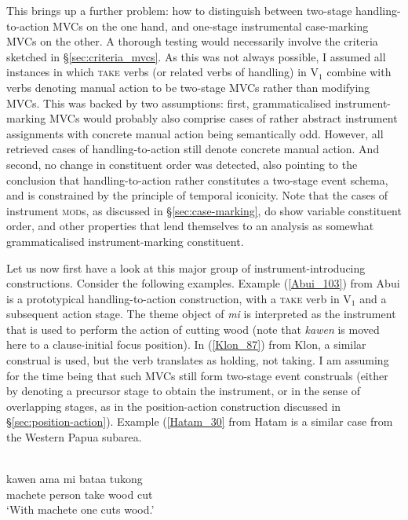 This brings up a further problem: how to distinguish between two-stage handling-to-action MVCs on the one hand, and one-stage instrumental case-marking MVCs on the other. A thorough testing would necessarily involve the criteria sketched in §\ref{sec:criteria_mvcs}. As this was not always possible, I assumed all instances in which \textsc{take} verbs (or related verbs of handling) in V$_1$ combine with verbs denoting manual action to be two-stage MVCs rather than modifying MVCs. This was backed by two assumptions: first, grammaticalised instrument-marking MVCs would probably also comprise cases of rather abstract instrument assignments with concrete manual action being semantically odd. However, all retrieved cases of handling-to-action still denote concrete manual action. And second, no change in constituent order was detected, also pointing to the conclusion that handling-to-action rather constitutes a two-stage event schema, and is constrained by the principle of temporal iconicity. Note that the cases of instrument \textsc{mod}s, as discussed in §\ref{sec:case-marking}, do show variable constituent order, and other properties that lend themselves to an analysis as somewhat grammaticalised instrument-marking constituent.

Let us now first have a look at this major group of instrument-introducing constructions. Consider the following examples. Example (\ref{Abui_103}) from Abui is a prototypical handling-to-action construction, with a \textsc{take} verb in V$_1$ and a subsequent action stage. The theme object of \textit{mi} is interpreted as the instrument that is used to perform the action of cutting wood (note that \textit{kawen} is moved here to a clause-initial focus position). In (\ref{Klon_87}) from Klon, a similar construal is used, but the verb translates as holding, not taking. I am assuming for the time being that such MVCs still form two-stage event construals (either by denoting a precursor stage to obtain the instrument, or in the sense of overlapping stages, as in the position-action construction discussed in §\ref{sec:position-action}). Example (\ref{Hatam_30} from Hatam is a similar case from the Western Papua subarea.

\ea \label{Abui_103}
\\
\gll kawen ama mi bataa tukong \\
machete person take wood cut \\
\glft `With machete one cuts wood.'\\ 
\z

